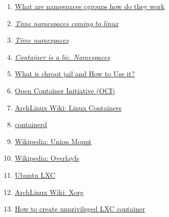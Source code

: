 \documentclass[a4paper, oneside, 12pt]{book}
\begin{document}
\begin{enumerate}
		\item
		\label{bib: cgroups}
		\href{https://www.nginx.com/blog/what-are-namespaces-cgroups-how-do-they-work/}{What are namespaces cgroups how do they work}
		
		\item 
		\label{bib:time ns} \href{https://www.phoronix.com/scan.php?page=news_item&px=Linux-Time-Namespace-Coming}{\textit{Time namespaces coming to linux}}
		
		\item
		\label{bib:time ns kernel}
		\href{https://git.kernel.org/pub/scm/linux/kernel/git/tip/tip.git/commit/?h=timers/core&id=769071ac9f20b6a447410c7eaa55d1a5233ef40c}{\textit{Time namespaces}}
		
		\item 
		\label{bib:container is a lie} \href{https://platform.sh/blog/2020/the-container-is-a-lie/}{\textit{Container is a lie. Namespaces}}
		
		\item
		\label{bib: chroot jail}
		\href{https://phoenixnap.com/kb/chroot-jail}{What is chroot jail and How to Use it?}
		
		\item
		\label{bib: oci}
		\href{https://opencontainers.org/}{Open Container Initiative (OCI)}
		
		\item
		\label{bib: LXC arch}
		\href{https://wiki.archlinux.org/title/Linux_Containers}{ArchLinux Wiki: Linux Containers}
		
		\item
		\label{bib: containerd}
		\href{https://containerd.io/}{containerd}
		
		\item
		\label{bib: union mount}
		\href{https://en.wikipedia.org/wiki/Union_mount}{Wikipedia: Union Mount}
		
		\item
		\label{bib: overlayfs}
		\href{https://en.wikipedia.org/wiki/OverlayFS}{Wikipedia: Overlayfs}
		
		\item
		\label{bib: crear LXC}
		\href{https://ubuntu.com/server/docs/containers-lxc}{Ubuntu LXC}
		
		\item
		\label{bib: xorg arch wiki}
		\href{https://wiki.archlinux.org/title/xorg}{ArchLinux Wiki: Xorg}
		
		\item
		\label{bib: unprivileged LXC}
		\href{https://www.cyberciti.biz/faq/how-to-create-unprivileged-linux-containers-on-ubuntu-linux/}{How to create unprivileged LXC container}
		

\end{enumerate}
\end{document}
